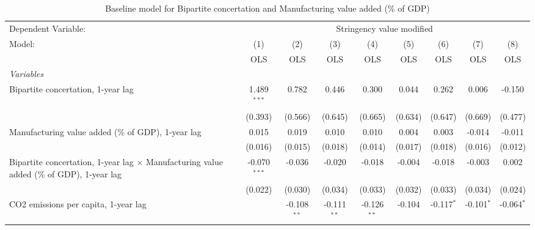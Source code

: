 
\begin{table}[htbp]
   \caption{Baseline model for Bipartite concertation and Manufacturing value added (\% of GDP)}
   \centering
   \begin{tabular}{lcccccccc}
      \toprule
      Dependent Variable: & \multicolumn{8}{c}{Stringency value modified}\\
      Model:                                                                                          & (1)            & (2)           & (3)           & (4)           & (5)           & (6)           & (7)           & (8)\\  
                                                                                                      &  OLS           & OLS           & OLS           & OLS           & OLS           & OLS           & OLS           & OLS\\  
      \midrule
      \emph{Variables}\\
      Bipartite concertation, 1-year lag                                                              & 1.489$^{***}$  & 0.782         & 0.446         & 0.300         & 0.044         & 0.262         & 0.006         & -0.150\\   
                                                                                                      & (0.393)        & (0.566)       & (0.645)       & (0.665)       & (0.634)       & (0.647)       & (0.669)       & (0.477)\\   
      Manufacturing value added (\% of GDP), 1-year lag                                               & 0.015          & 0.019         & 0.010         & 0.010         & 0.004         & 0.003         & -0.014        & -0.011\\   
                                                                                                      & (0.016)        & (0.015)       & (0.018)       & (0.014)       & (0.017)       & (0.018)       & (0.016)       & (0.012)\\   
      Bipartite concertation, 1-year lag $\times$ Manufacturing value added (\% of GDP), 1-year lag   & -0.070$^{***}$ & -0.036        & -0.020        & -0.018        & -0.004        & -0.018        & -0.003        & 0.002\\   
                                                                                                      & (0.022)        & (0.030)       & (0.034)       & (0.033)       & (0.032)       & (0.033)       & (0.034)       & (0.024)\\   
      CO2 emissions per capita, 1-year lag                                                            &                & -0.108$^{**}$ & -0.111$^{**}$ & -0.126$^{**}$ & -0.104        & -0.117$^{*}$  & -0.101$^{*}$  & -0.064$^{*}$\\   

\end{tabular}
\end{table}
